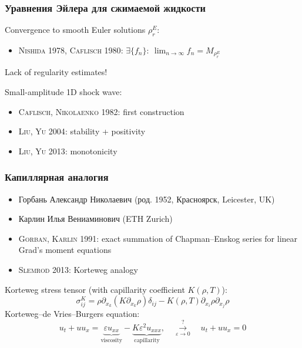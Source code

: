 \documentclass[mathserif]{beamer} %
\newcommand{\pder}[2][]{\partial_{#2}{#1}}
\newcommand{\Cite}[2][]{\alert{\textsc{#2 #1}}}
\renewcommand{\epsilon}{\varepsilon}
\begin{document}
\begin{frame}
    \frametitle{Уравнения Эйлера для сжимаемой жидкости}
    Convergence to smooth Euler solutions \(\rho_r^E\):
    \begin{itemize}
        \item \Cite[1978]{Nishida}, \Cite[1980]{Caflisch}:
        \(\exists \{f_n\}: \: \displaystyle\lim_{n\to\infty} f_n = M_{\rho_r^E}\)
    \end{itemize}
    Lack of regularity estimates!

    Small-amplitude 1D shock wave:
    \begin{itemize}
        \item \Cite[1982]{Caflisch, Nikolaenko}: first construction
        \item \Cite[2004]{Liu, Yu}: stability + positivity
        \item \Cite[2013]{Liu, Yu}: monotonicity
    \end{itemize}
\end{frame}

\begin{frame}
    \frametitle{Капиллярная аналогия}
    {\footnotesize
    \begin{itemize}
        \item Горбань Александр Николаевич (род. 1952, Красноярск, Leicester, UK) %
        \item Карлин Илья Вениаминович (ETH Zurich)
    \end{itemize}}
    \begin{itemize}
        \item \Cite[1991]{Gorban, Karlin}: exact summation of Chapman--Enskog series for linear Grad's moment equations
        \item \Cite[2013]{Slemrod}: Korteweg analogy
    \end{itemize}
    Korteweg stress tensor (with capillarity coefficient \(K(\rho,T)\)):
    \[ \sigma_{ij}^K = \rho\pder{x_k}\left( K\pder[\rho]{x_k} \right)\delta_{ij}
        - K(\rho,T)\pder[\rho]{x_i}\pder[\rho]{x_j} \]
    Korteweg–de Vries–Burgers equation:
    \[ u_t + uu_x = \underbrace{\epsilon u_{xx}}_\text{viscosity}
        - \underbrace{K\epsilon^2u_{xxx}}_\text{capillarity},
        \quad \overset{?}{\underset{\epsilon\to0}{\longrightarrow}}\quad u_t + uu_x = 0  \]
\end{frame}
\end{document}
